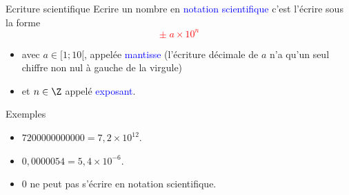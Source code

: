 \documentclass[10pt]{beamer}
\begin{document}
\begin{frame}{\Ctitle}{\stitle}
	\begin{block}{\textcolor{yellow}{\small \rappel} Ecriture scientifique}
		Ecrire un nombre en \textcolor{blue}{notation scientifique} c'est l'écrire sous la forme
		\onslide<2->\textcolor{red}{$$\boxed{\pm \; a \times 10^n}$$} \vspace{-0.5cm}
		\begin{itemize}
			\item<3-> avec $a \in [1;10[$, appelée \textcolor{blue}{mantisse} (l'écriture  décimale de $a$ n'a qu'un seul chiffre non nul à gauche de la virgule)
			\item<4-> et $n \in \Z$ appelé \textcolor{blue}{exposant}.
		\end{itemize}
	\end{block}
	\begin{exampleblock}{Exemples}
		\begin{itemize}
			\item<5-> $7200000000000 = 7,2 \times 10^{12}$.
			\item<6-> $0,0000054 = 5,4 \times 10^{-6}$.
			\item<7-> 0 ne peut pas s'écrire en notation scientifique.
		\end{itemize}
	\end{exampleblock}
\end{frame}
\end{document}
